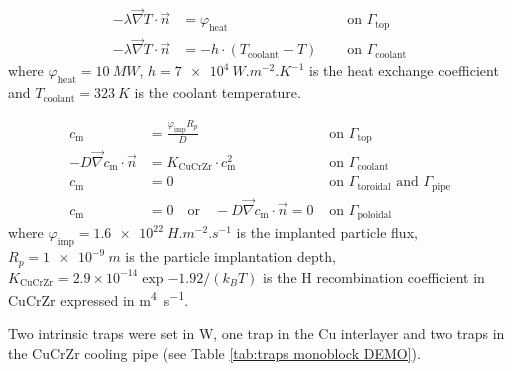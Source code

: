 \begin{subequations}
    \begin{align}
    -\lambda \vec{\nabla} T \cdot \vec{n} &=\varphi_\mathrm{heat} \quad  &\text { on } \Gamma_\mathrm{top}\\
    -\lambda \vec{\nabla} T\cdot \vec{n} &= -h \cdot \left(T_\mathrm{coolant} - T\right)\quad &\text { on } \Gamma_\mathrm{coolant}
    \end{align}
    \label{eq: bc thermal DEMO monoblock}
\end{subequations}
where $\varphi_\mathrm{heat}=\SI{10}{MW}$, $h=\SI{7e4}{W.m^{-2}.K^{-1}}$ is the heat exchange coefficient and $T_\mathrm{coolant} = \SI{323}{K}$ is the coolant temperature.

\begin{subequations}
    \begin{align}
    c_\mathrm{m} &=  \frac{\varphi_\mathrm{imp} R_p}{D} \quad &\text { on } \Gamma_\mathrm{top}\\
    -D \vec{\nabla} c_\mathrm{m} \cdot \vec{n} &= K_\mathrm{CuCrZr} \cdot c_\mathrm{m}^{2} \quad &\text { on } \Gamma_\mathrm{coolant} \\
    c_\mathrm{m} &=  0 \quad &\text { on } \Gamma_\mathrm{toroidal} \text{  and  } \Gamma_\mathrm{pipe} \\
    c_\mathrm{m} &=  0 \quad \text{or} \quad -D \vec{\nabla} c_\mathrm{m} \cdot \vec{n} = 0 &\text { on } \Gamma_\mathrm{poloidal}
    \end{align}
    \label{eq: bc H transport DEMO monoblock}
\end{subequations}
where $\varphi_\mathrm{imp} = \SI{1.6e22}{H.m^{-2}.s^{-1}}$ is the implanted particle flux, $R_p = \SI{1e-9}{m}$ is the particle implantation depth, $K_\mathrm{CuCrZr}=2.9\times 10^{-14}\exp{-1.92/(k_B T)}$ is the H recombination coefficient in CuCrZr expressed in \si{m^4.s^{-1}}.

Two intrinsic traps were set in W, one trap in the Cu interlayer and two traps in the CuCrZr cooling pipe (see Table \ref{tab:traps monoblock DEMO}).

